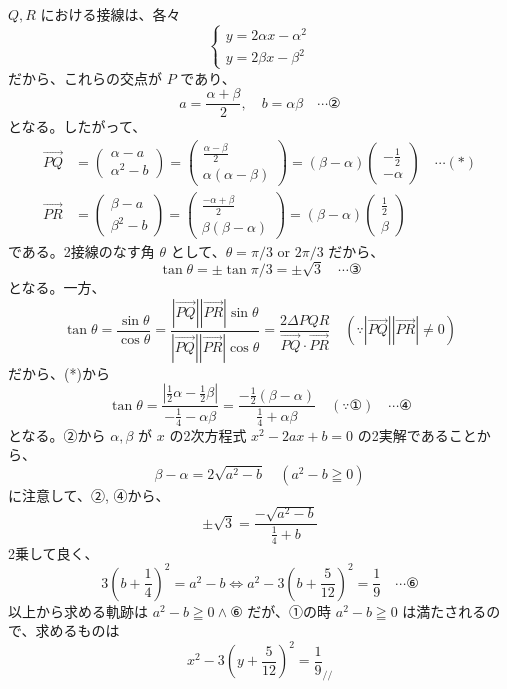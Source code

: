 \documentclass[../main.tex]{subfiles}
\begin{document}
$Q, R$ における接線は、各々
\[
  \begin{cases}
    y = 2\alpha x - \alpha^2 \\
    y = 2\beta x - \beta^2
  \end{cases}
\]
だから、これらの交点が $P$ であり、
\[
  a = \frac{\alpha+\beta}{2}, \quad b = \alpha\beta \quad \cdots \text{②}
\]
となる。したがって、
\[
  \begin{aligned}
    \vec{PQ} &=
    \begin{pmatrix} \alpha-a \\ \alpha^2-b
    \end{pmatrix} =
    \begin{pmatrix} \frac{\alpha-\beta}{2} \\ \alpha(\alpha-\beta)
    \end{pmatrix} = (\beta-\alpha)
    \begin{pmatrix} -\frac{1}{2} \\ -\alpha
    \end{pmatrix} \quad \cdots (*) \\
    \vec{PR} &=
    \begin{pmatrix} \beta-a \\ \beta^2-b
    \end{pmatrix} =
    \begin{pmatrix} \frac{-\alpha+\beta}{2} \\ \beta(\beta-\alpha)
    \end{pmatrix} = (\beta-\alpha)
    \begin{pmatrix} \frac{1}{2} \\ \beta
    \end{pmatrix}
  \end{aligned}
\]
である。2接線のなす角 $\theta$ として、$\theta = \pi/3$ or $2\pi/3$ だから、
\[
  \tan\theta = \pm \tan\pi/3 = \pm \sqrt{3} \quad \cdots \text{③}
\]
となる。一方、
\[
  \tan\theta = \frac{\sin\theta}{\cos\theta} = \frac{|\vec{PQ}||\vec{PR}|\sin\theta}{|\vec{PQ}||\vec{PR}|\cos\theta} = \frac{2 \Delta PQR}{\vec{PQ}\cdot\vec{PR}} \quad (\because |\vec{PQ}||\vec{PR}| \neq 0)
\]
だから、(*)から
\[
  \tan\theta = \frac{|\frac{1}{2}\alpha - \frac{1}{2}\beta|}{-\frac{1}{4} - \alpha\beta} = \frac{-\frac{1}{2}(\beta-\alpha)}{\frac{1}{4} + \alpha\beta} \quad (\because \text{①}) \quad \cdots \text{④}
\]
となる。②から $\alpha, \beta$ が $x$ の2次方程式 $x^2 - 2ax + b = 0$ の2実解であることから、
\[
  \beta-\alpha = 2\sqrt{a^2-b} \quad (a^2-b \geqq 0)
\]
に注意して、②, ④から、
\[
  \pm \sqrt{3} = \frac{-\sqrt{a^2-b}}{\frac{1}{4}+b}
\]
2乗して良く、
\[
  3\left(b + \frac{1}{4}\right)^2 = a^2 - b \iff a^2 - 3\left(b + \frac{5}{12}\right)^2 = \frac{1}{9} \quad \cdots \text{⑥}
\]
以上から求める軌跡は $a^2 - b \geqq 0 \land \text{⑥}$ だが、①の時 $a^2 - b \geqq 0$ は満たされるので、求めるものは
\[
  x^2 - 3\left(y + \frac{5}{12}\right)^2 = \frac{1}{9}_{\mathbin{/\!/}}
\]
\end{document}
